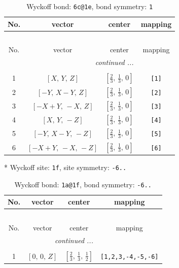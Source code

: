 \documentclass[fleqn,8pt]{jsarticle}
\begin{document}
\begin{longtable}{cccc}
\caption{Wyckoff bond: {\tt 6c@1e}, bond symmetry: {\tt 1}}
 \\
 \hline \hline
No. & vector & center & mapping \\ \hline \endfirsthead

\multicolumn{3}{l}{\tablename\ \thetable{}} \\
 \hline \hline
No. & vector & center & mapping \\ \hline \endhead

 \hline \hline
\multicolumn{3}{r}{\footnotesize\it continued ...} \\ \endfoot

 \hline \hline
\multicolumn{3}{r}{} \\ \endlastfoot

1 & $\left[ X,\, Y,\, Z \right]$ & $\left[ \frac{2}{3},\, \frac{1}{3},\, 0 \right]$ & {\tt [1]} \\ \hline
2 & $\left[ - Y,\, X - Y,\, Z \right]$ & $\left[ \frac{2}{3},\, \frac{1}{3},\, 0 \right]$ & {\tt [2]} \\ \hline
3 & $\left[ - X + Y,\, - X,\, Z \right]$ & $\left[ \frac{2}{3},\, \frac{1}{3},\, 0 \right]$ & {\tt [3]} \\ \hline
4 & $\left[ X,\, Y,\, - Z \right]$ & $\left[ \frac{2}{3},\, \frac{1}{3},\, 0 \right]$ & {\tt [4]} \\ \hline
5 & $\left[ - Y,\, X - Y,\, - Z \right]$ & $\left[ \frac{2}{3},\, \frac{1}{3},\, 0 \right]$ & {\tt [5]} \\ \hline
6 & $\left[ - X + Y,\, - X,\, - Z \right]$ & $\left[ \frac{2}{3},\, \frac{1}{3},\, 0 \right]$ & {\tt [6]} \\
\end{longtable}
* Wyckoff site: {\tt 1f}, site symmetry: {\tt -6..}
\renewcommand{\arraystretch}{1.2}
\begin{longtable}{cccc}
\caption{Wyckoff bond: {\tt 1a@1f}, bond symmetry: {\tt -6..}}
 \\
 \hline \hline
No. & vector & center & mapping \\ \hline \endfirsthead

\multicolumn{3}{l}{\tablename\ \thetable{}} \\
 \hline \hline
No. & vector & center & mapping \\ \hline \endhead

 \hline \hline
\multicolumn{3}{r}{\footnotesize\it continued ...} \\ \endfoot

 \hline \hline
\multicolumn{3}{r}{} \\ \endlastfoot

1 & $\left[ 0,\, 0,\, Z \right]$ & $\left[ \frac{2}{3},\, \frac{1}{3},\, \frac{1}{2} \right]$ & {\tt [1,2,3,-4,-5,-6]} \\
\end{longtable}
\end{document}
